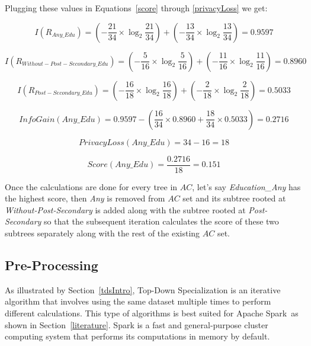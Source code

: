 \documentclass[11pt]{article}       %
\begin{document}
Plugging these values in Equations~\ref{score} through \ref{privacyLoss} we get:

\[ I (R_{Any\_Edu}) = (- \frac{21}{34} \times \log_2 \frac{21}{34}) + (- \frac{13}{34} \times \log_2 \frac{13}{34}) = 0.9597 \]

\[ I (R_{Without-Post-Secondary\_Edu}) = (- \frac{5}{16} \times \log_2 \frac{5}{16}) + (- \frac{11}{16} \times \log_2 \frac{11}{16}) = 0.8960 \]

\[ I (R_{Post-Secondary\_Edu}) = (- \frac{16}{18} \times \log_2 \frac{16}{18}) + (- \frac{2}{18} \times \log_2 \frac{2}{18}) = 0.5033 \]

\[ InfoGain(Any\_Edu) = 0.9597 - (\frac{16}{34} \times 0.8960 + \frac{18}{34} \times 0.5033) = 0.2716 \]

\[ PrivacyLoss(Any\_Edu) = 34 - 16 = 18 \]

\[ Score(Any\_Edu) = \frac{0.2716}{18} = 0.151 \]

Once the calculations are done for every tree in $AC$, let's say \emph{Education\_Any} has the highest score, then \emph{Any} is removed from $AC$ set and its subtree rooted at \emph{Without-Post-Secondary} is added along with the subtree rooted at \emph{Post-Secondary} so that the subsequent iteration calculates the score of these two subtrees separately along with the rest of the existing $AC$ set.

\subsection{Pre-Processing}

As illustrated by Section~\ref{tdsIntro}, Top-Down Specialization is an iterative algorithm that involves using the same dataset multiple times to perform different calculations. This type of algorithms is best suited for Apache Spark\texttrademark~as shown in Section~\ref{literature}. Spark is a fast and general-purpose cluster computing system that performs its computations in memory by default.
\end{document}

